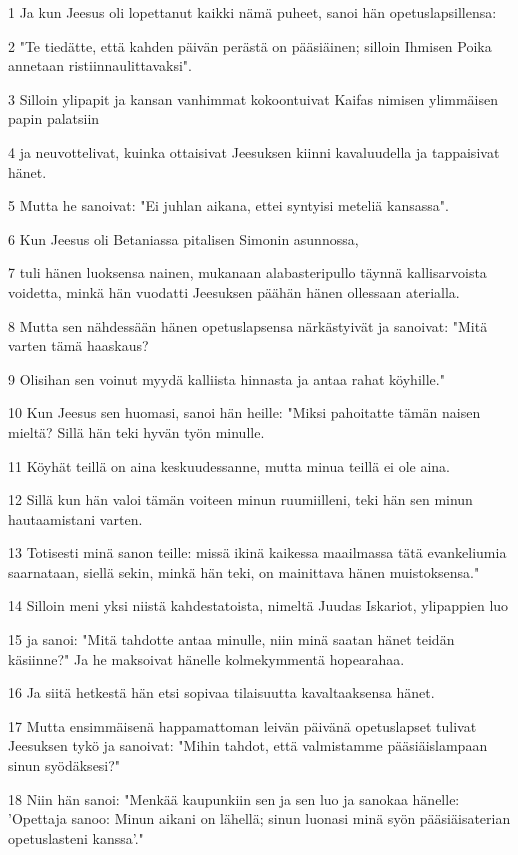 \par 1 Ja kun Jeesus oli lopettanut kaikki nämä puheet, sanoi hän opetuslapsillensa:
\par 2 "Te tiedätte, että kahden päivän perästä on pääsiäinen; silloin Ihmisen Poika annetaan ristiinnaulittavaksi".
\par 3 Silloin ylipapit ja kansan vanhimmat kokoontuivat Kaifas nimisen ylimmäisen papin palatsiin
\par 4 ja neuvottelivat, kuinka ottaisivat Jeesuksen kiinni kavaluudella ja tappaisivat hänet.
\par 5 Mutta he sanoivat: "Ei juhlan aikana, ettei syntyisi meteliä kansassa".
\par 6 Kun Jeesus oli Betaniassa pitalisen Simonin asunnossa,
\par 7 tuli hänen luoksensa nainen, mukanaan alabasteripullo täynnä kallisarvoista voidetta, minkä hän vuodatti Jeesuksen päähän hänen ollessaan aterialla.
\par 8 Mutta sen nähdessään hänen opetuslapsensa närkästyivät ja sanoivat: "Mitä varten tämä haaskaus?
\par 9 Olisihan sen voinut myydä kalliista hinnasta ja antaa rahat köyhille."
\par 10 Kun Jeesus sen huomasi, sanoi hän heille: "Miksi pahoitatte tämän naisen mieltä? Sillä hän teki hyvän työn minulle.
\par 11 Köyhät teillä on aina keskuudessanne, mutta minua teillä ei ole aina.
\par 12 Sillä kun hän valoi tämän voiteen minun ruumiilleni, teki hän sen minun hautaamistani varten.
\par 13 Totisesti minä sanon teille: missä ikinä kaikessa maailmassa tätä evankeliumia saarnataan, siellä sekin, minkä hän teki, on mainittava hänen muistoksensa."
\par 14 Silloin meni yksi niistä kahdestatoista, nimeltä Juudas Iskariot, ylipappien luo
\par 15 ja sanoi: "Mitä tahdotte antaa minulle, niin minä saatan hänet teidän käsiinne?" Ja he maksoivat hänelle kolmekymmentä hopearahaa.
\par 16 Ja siitä hetkestä hän etsi sopivaa tilaisuutta kavaltaaksensa hänet.
\par 17 Mutta ensimmäisenä happamattoman leivän päivänä opetuslapset tulivat Jeesuksen tykö ja sanoivat: "Mihin tahdot, että valmistamme pääsiäislampaan sinun syödäksesi?"
\par 18 Niin hän sanoi: "Menkää kaupunkiin sen ja sen luo ja sanokaa hänelle: 'Opettaja sanoo: Minun aikani on lähellä; sinun luonasi minä syön pääsiäisaterian opetuslasteni kanssa'."
